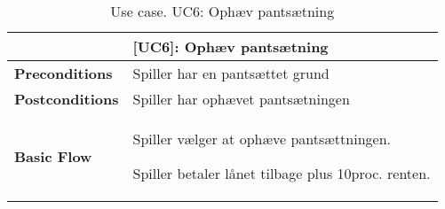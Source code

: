 \documentclass[class=article, crop=false]{standalone}
\begin{document}
    \begin{table}[H]
        \caption{Use case. UC6: Ophæv pantsætning}
        \begin{tabularx}{\textwidth}{|l|X|}
            \hline
            & \textbf{[UC6]: Ophæv pantsætning}   \\ \hline
            \textbf{Preconditions}       & Spiller har en pantsættet grund\\ \hline
            \textbf{Postconditions}      & Spiller har ophævet pantsætningen\\ \hline


            \textbf{Basic Flow} & \begin{tabenum}
                                      \item Spiller vælger at ophæve pantsættningen.
                                      \item Spiller betaler lånet tilbage plus 10proc. renten.
            \end{tabenum}   \\ \hline



        \end{tabularx}


    \end{table}
\end{document}
